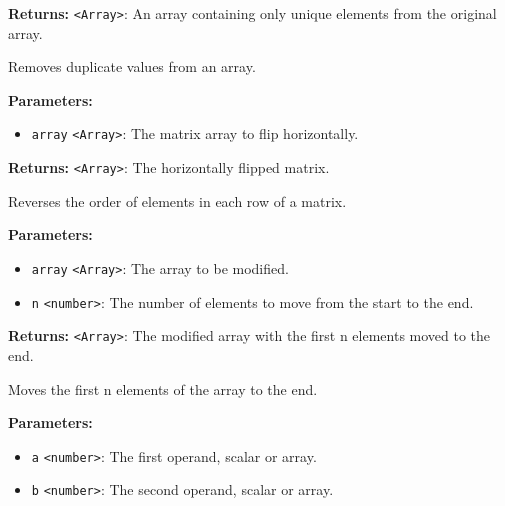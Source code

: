 \documentclass[12pt,a4paper]{article}
\begin{document}
\noindent \textbf{Returns:} \texttt{<Array>}: An array containing only unique elements from the original array.

\noindent Removes duplicate values from an array.

\vspace{5mm}
\noindent {}


\noindent \textbf{Parameters:}
\begin{itemize}
  \item \texttt{array} \texttt{<Array>}: The matrix array to flip horizontally.
\end{itemize}

\noindent \textbf{Returns:} \texttt{<Array>}: The horizontally flipped matrix.

\noindent Reverses the order of elements in each row of a matrix.

\vspace{5mm}
\noindent {}


\noindent \textbf{Parameters:}
\begin{itemize}
  \item \texttt{array} \texttt{<Array>}: The array to be modified.
  \item \texttt{n} \texttt{<number>}: The number of elements to move from the start to the end.
\end{itemize}

\noindent \textbf{Returns:} \texttt{<Array>}: The modified array with the first \textasciigrave{}n\textasciigrave{} elements moved to the end.

\noindent Moves the first \textasciigrave{}n\textasciigrave{} elements of the array to the end.

\vspace{5mm}
\noindent {}


\noindent \textbf{Parameters:}
\begin{itemize}
  \item \texttt{a} \texttt{<number>}: The first operand, scalar or array.
  \item \texttt{b} \texttt{<number>}: The second operand, scalar or array.
\end{itemize}
\end{document}
